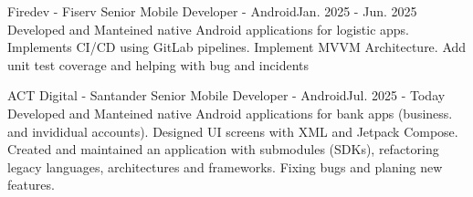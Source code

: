     \resumeSubheading
      {Firedev - Fiserv}{}
      {Senior Mobile Developer - Android}{Jan. 2025 - Jun. 2025}
      \resumeItemListStart
          {Developed and Manteined native Android applications for logistic apps. Implements CI/CD using GitLab pipelines. Implement MVVM Architecture. Add unit test coverage and helping with bug and incidents}
      \resumeItemListEnd

    \resumeSubheading
      {ACT Digital - Santander}{}
      {Senior Mobile Developer - Android}{Jul. 2025 - Today}
      \resumeItemListStart
          {Developed and Manteined native Android applications for bank apps (business. and invididual accounts). Designed UI screens with XML and Jetpack Compose. Created and maintained an application with submodules (SDKs), refactoring  legacy languages, architectures and frameworks. Fixing bugs and planing new features.}
      \resumeItemListEnd

  \resumeSubHeadingListEnd
